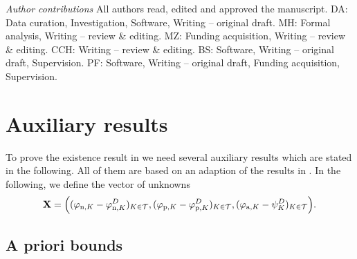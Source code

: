 \documentclass[10pt,a4paper, final]{article}
\def\electrons{\text{n}}
\def\holes{\text{p}}
\def\ions{\text{a}}
\theoremstyle{definition}								%
\numberwithin{equation}{section}
\numberwithin{figure}{section}
\numberwithin{theorem}{section}
\renewcommand{\appendix}{\par
  \setcounter{section}{0}
  \setcounter{subsection}{0}
  \gdef\thesection{\Alph{section}}
}
\begin{document}

\vspace{1em}
\noindent
\textit{Author contributions}
All authors read, edited and approved the manuscript.
DA: Data curation, Investigation, Software, Writing -- original draft.
MH: Formal analysis, Writing -- review \& editing.
MZ: Funding acquisition, Writing -- review \& editing.
CCH: Writing -- review \& editing.
BS: Software, Writing -- original draft, Supervision.
PF: Software, Writing -- original draft, Funding acquisition, Supervision.

\appendix

\section{Auxiliary results} \label{app:auxiliary-results}

To prove the existence result in  we need several auxiliary results which are stated in the following.
All of them are based on an adaption of the results in \cite{Abdel2023Existence}.
In the following, we define the vector of unknowns
\begin{equation}\label{def.X}
    \mathbf{X} = \Bigl( (\varphi_{\electrons,K}-\varphi_{\electrons,K}^D)_{K\in\mathcal{T}}, (\varphi_{\holes,K}-\varphi_{\holes,K}^D)_{K\in\mathcal{T}},(\varphi_{\ions,K}-\psi_{K}^D)_{K\in\mathcal{T}} \Bigr).
\end{equation}
\subsection{A priori bounds}
\end{document}
